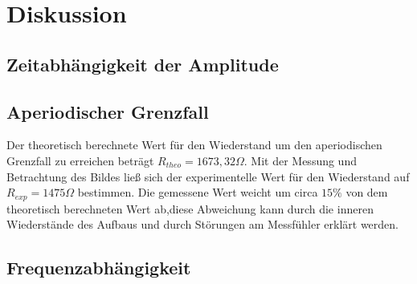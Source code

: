 \newpage
\section{Diskussion}
\label{sec:Diskussion}
\subsection{Zeitabhängigkeit der Amplitude}

\subsection{Aperiodischer Grenzfall}
Der theoretisch berechnete Wert für den Wiederstand um den aperiodischen Grenzfall zu erreichen beträgt $R_{theo}=1673,32 \Omega$.
Mit der Messung und Betrachtung des Bildes ließ sich der experimentelle Wert für den Wiederstand auf $R_{exp} = 1475\Omega$ bestimmen.
Die gemessene Wert weicht um circa $15\%$ von dem theoretisch berechneten Wert ab,diese Abweichung kann durch die inneren Wiederstände des Aufbaus und durch Störungen am Messfühler erklärt werden.
\subsection{Frequenzabhängigkeit}
